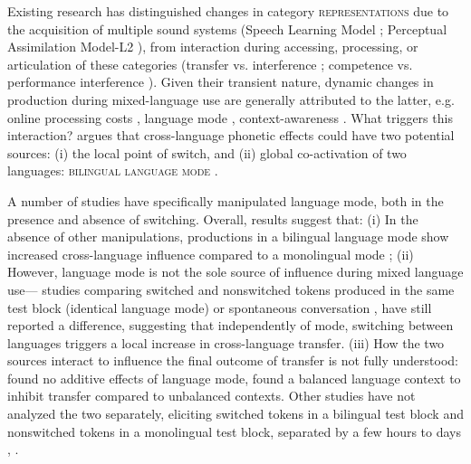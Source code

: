 \documentclass[12 pt]{article}
\begin{document}
Existing research has distinguished changes in category \textsc{representations} due to the acquisition of multiple sound systems (Speech Learning Model \citep{flege1995second,flege2007language}; Perceptual Assimilation Model-L2 \citep{best2007nonnative}), from interaction during accessing, processing, or articulation of these categories (transfer vs. interference \citep{grosjean2012attempt}; competence vs. performance interference \citep{paradis1993linguistic}). 
Given their transient nature, dynamic changes in production during mixed-language use are generally attributed to the latter, e.g. online processing costs \citep[][VOT]{olson2013bilingual,tsui2019impact,vsimavckova2015immediate}, language mode \citep[][vowel quality]{simonet2014phonetic}, context-awareness \citep[][phonological variables]{khattab2013phonetic}. What triggers this interaction? \cite{olson2016role} argues that cross-language phonetic effects could have two potential sources: (i) the local point of switch, and (ii) global co-activation of two languages: \textsc{bilingual language mode} \citep{grosjean1998studying}.

A number of studies have specifically manipulated language mode, both in the presence and absence of switching. Overall, results suggest that: (i) In the absence of other manipulations, productions in a bilingual language mode show increased cross-language influence compared to a monolingual mode \citep[][vowel quality]{simonet2020increased,simonet2014phonetic}; (ii) However, language mode is not the sole source of influence during mixed language use--- studies comparing switched and nonswitched tokens produced in the same test block (identical language mode) \citep[][VOT]{olson2016role,tsui2019impact} or spontaneous conversation \citep[][VOT]{piccinini2015voice}, have still reported a difference, suggesting that independently of mode, switching between languages triggers a local increase in cross-language transfer. (iii) How the two sources interact to influence the final outcome of transfer is not fully understood: \citet[][VOT]{olson2016role} found no additive effects of language mode, \citet[][VOT]{olson2013bilingual} found a balanced language context to inhibit transfer compared to unbalanced contexts.  Other studies have not analyzed the two separately, eliciting switched tokens in a bilingual test block and nonswitched tokens in a monolingual test block, separated by a few hours to days \citep[][vowel quality]{elias2017effects}, \citep[][VOT]{schwartz2015language, bullock2009trying,antoniou2011inter, vsimavckova2015immediate,vsimavckova2018patterns}.
\end{document}
